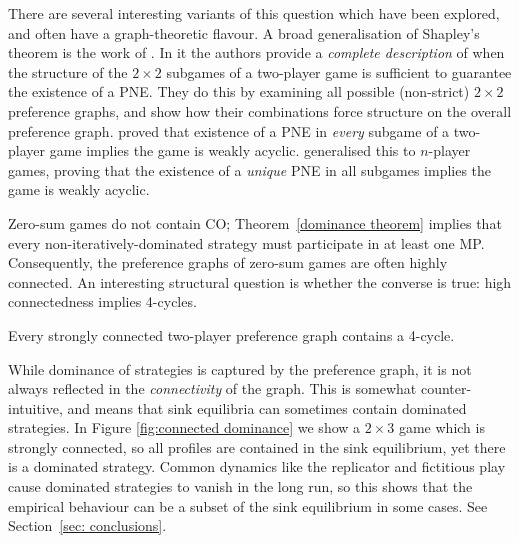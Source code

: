 \documentclass[preprint,authoryear]{elsarticle}
\begin{document}
There are several interesting variants of this question which have been explored, and often have a graph-theoretic flavour. A broad generalisation of Shapley's theorem is the work of \cite{boros2016sufficient}. In it the authors provide a \emph{complete description} of when the structure of the $2\times 2$ subgames of a two-player game is sufficient to guarantee the existence of a PNE. They do this by examining all possible (non-strict) $2\times 2$ preference graphs, and show how their combinations force structure on the overall preference graph. \cite{takahashi2002pure} proved that existence of a PNE in \emph{every} subgame of a two-player game implies the game is weakly acyclic. \cite{fabrikant_structure_2010} generalised this to $n$-player games, proving that the existence of a \emph{unique} PNE in all subgames implies the game is weakly acyclic.%

Zero-sum games do not contain CO; Theorem~\ref{dominance theorem} implies that every non-iteratively-dominated strategy must participate in at least one MP. Consequently, the preference graphs of zero-sum games are often highly connected. An interesting structural question is whether the converse is true: high connectedness implies 4-cycles.

\begin{conj}
    Every strongly connected two-player preference graph contains a 4-cycle.
\end{conj}

While dominance of strategies is captured by the preference graph, it is not always reflected in the \emph{connectivity} of the graph. This is somewhat counter-intuitive, and means that sink equilibria can sometimes contain dominated strategies. In Figure \ref{fig:connected dominance} we show a $2\times 3$ game which is strongly connected, so all profiles are contained in the sink equilibrium, yet there is a dominated strategy. Common dynamics like the replicator and fictitious play cause dominated strategies to vanish in the long run, so this shows that the empirical behaviour can be a subset of the sink equilibrium in some cases. See Section~\ref{sec: conclusions}.
\end{document}

